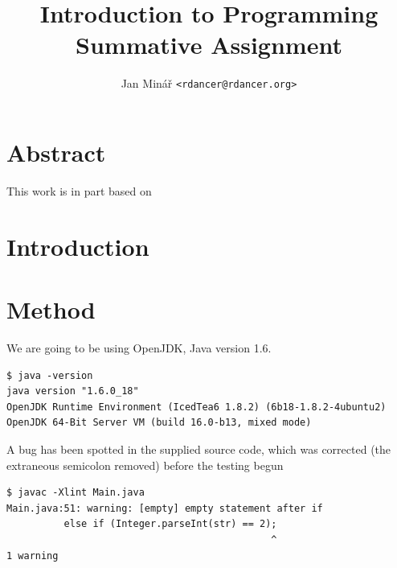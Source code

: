 \documentclass[10pt]{report}
\author{Jan Minář {\tt <rdancer@rdancer.org>}}
\title{Introduction to Programming\\Summative Assignment}
\begin{document}


\maketitle



\chapter{Abstract}
\thispagestyle{fancy}
This work is in part based on \cite{minar}

\chapter{Introduction}
\thispagestyle{fancy}

\chapter{Method}
\thispagestyle{fancy}

We are going to be using OpenJDK, Java version 1.6.
\begin{verbatim}
$ java -version
java version "1.6.0_18"
OpenJDK Runtime Environment (IcedTea6 1.8.2) (6b18-1.8.2-4ubuntu2)
OpenJDK 64-Bit Server VM (build 16.0-b13, mixed mode)
\end{verbatim}


A bug has been spotted in the supplied source code, which was corrected (the extraneous semicolon removed) before the testing begun

\begin{verbatim}
$ javac -Xlint Main.java
Main.java:51: warning: [empty] empty statement after if
          else if (Integer.parseInt(str) == 2);
                                              ^
1 warning
\end{verbatim}
\end{document}
